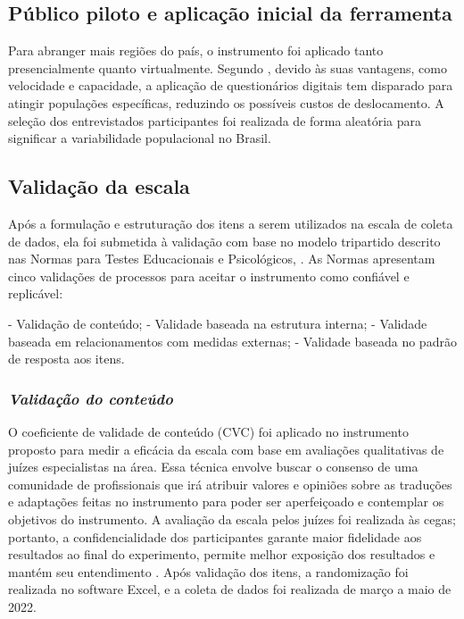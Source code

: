 \subsection{Público piloto e aplicação inicial da ferramenta}

Para abranger mais regiões do país, o instrumento foi aplicado tanto presencialmente quanto virtualmente. Segundo , devido às suas vantagens, como velocidade e capacidade, a aplicação de questionários digitais tem disparado para atingir populações específicas, reduzindo os possíveis custos de deslocamento. A seleção dos entrevistados participantes foi realizada de forma aleatória para significar a variabilidade populacional no Brasil.

\subsection{Validação da escala}

Após a formulação e estruturação dos itens a serem utilizados na escala de coleta de dados, ela foi submetida à validação com base no modelo tripartido descrito nas Normas para Testes Educacionais e Psicológicos, \cite{Association2018}. As Normas apresentam cinco validações de processos para aceitar o instrumento como confiável e replicável:


\begin{enumerate}[label=(\roman*)]
- Validação de conteúdo;
- Validade baseada na estrutura interna;
- Validade baseada em relacionamentos com medidas externas;
- Validade baseada no padrão de resposta aos itens.
\end{enumerate}


\subsubsection*{\textit{Validação do conteúdo}}
O coeficiente de validade de conteúdo (CVC) foi aplicado no instrumento proposto para medir a eficácia da escala com base em avaliações qualitativas de juízes especialistas na área. Essa técnica envolve buscar o consenso de uma comunidade de profissionais que irá atribuir valores e opiniões sobre as traduções e adaptações feitas no instrumento para poder ser aperfeiçoado e contemplar os objetivos do instrumento. A avaliação da escala pelos juízes foi realizada às cegas; portanto, a confidencialidade dos participantes garante maior fidelidade aos resultados ao final do experimento, permite melhor exposição dos resultados e mantém seu entendimento \cite{Hasson2000}. Após validação dos itens, a randomização foi realizada no software Excel, e a coleta de dados foi realizada de março a maio de 2022.

